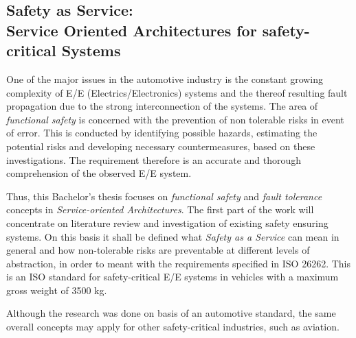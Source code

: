 \documentclass[12pt]{report}
\begin{document}
\thispagestyle{myheadings}

\begin{center}
\section*{Safety as Service:\\ Service Oriented Architectures for safety-critical Systems}
\end{center}
One of the major issues in the automotive industry is the constant growing complexity of E/E (Electrics/Electronics) systems and the thereof resulting fault propagation due to the strong interconnection of the systems. The area of \emph{functional safety} is concerned with the prevention of non tolerable risks in event of error. This is conducted by identifying possible hazards, estimating the potential risks and developing necessary countermeasures, based on these investigations. The requirement therefore is an accurate and thorough comprehension of the observed E/E system.

Thus, this Bachelor's thesis focuses on \emph{functional safety} and \emph{fault tolerance} concepts in \emph{Service-oriented Architectures}. The first part of the work will concentrate on literature review and investigation of existing safety ensuring systems. On this basis it shall be defined what \emph{Safety as a Service} can mean in general and how non-tolerable risks are preventable at different levels of abstraction, in order to meant with the requirements specified in ISO 26262. This is an ISO standard for safety-critical E/E systems in vehicles with a maximum gross weight of 3500 kg.

Although the research was done on basis of an automotive standard, the same overall concepts may apply for other safety-critical industries, such as aviation.
\end{document}
